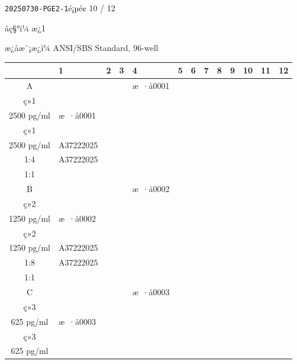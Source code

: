\documentclass[UTF8,10pt,a4paper,fontset=fandol]{ctexart}
\newcommand{\fieldvalue}[1]{#1}
\begin{document}
\newpage

\noindent\texttt{20250730-PGE2-1}\hfill é¡µé¢ 10 / 12

\vspace{0.4em}

\noindent
åç§°ï¼%
\fieldvalue{æ¿1}

\noindent
æ¿åæ¨¡æ¿ï¼%
\fieldvalue{ANSI/SBS Standard, 96-well}

\vspace{0.5em}

\begin{center}
\small
\begin{tabular}{c|*{12}{p{0.55cm}|}}
 & 1 & 2 & 3 & 4 & 5 & 6 & 7 & 8 & 9 & 10 & 11 & 12\\ \hline
A &
 & & &
\fieldvalue{\scriptsize æ ·å0001\\ç»1\\2500 pg/ml} &
\fieldvalue{\scriptsize æ ·å0001\\ç»1\\2500 pg/ml} &
\fieldvalue{\scriptsize A37222025\\1:4} &
\fieldvalue{\scriptsize A37222025\\1:1} &
 & & & & \\ \hline
B &
 & & &
\fieldvalue{\scriptsize æ ·å0002\\ç»2\\1250 pg/ml} &
\fieldvalue{\scriptsize æ ·å0002\\ç»2\\1250 pg/ml} &
\fieldvalue{\scriptsize A37222025\\1:8} &
\fieldvalue{\scriptsize A37222025\\1:1} &
 & & & & \\ \hline
C &
 & & &
\fieldvalue{\scriptsize æ ·å0003\\ç»3\\625 pg/ml} &
\fieldvalue{\scriptsize æ ·å0003\\ç»3\\625 pg/ml} &

\end{tabular}
\end{center}
\end{document}
